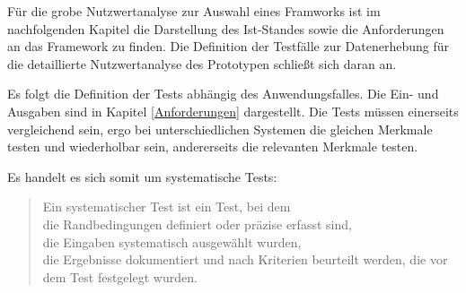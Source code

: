Für die grobe Nutzwertanalyse zur Auswahl eines Framworks ist im nachfolgenden Kapitel die Darstellung des Ist-Standes sowie die Anforderungen an das Framework zu finden.
Die Definition der Testfälle zur Datenerhebung für die detaillierte Nutzwertanalyse des Prototypen schließt sich daran an.

Es folgt die Definition der Tests abhängig des Anwendungsfalles.
Die Ein- und Ausgaben sind  in Kapitel \ref{Anforderungen} dargestellt.
Die Tests müssen einerseits vergleichend sein, ergo bei unterschiedlichen Systemen die gleichen Merkmale testen und wiederholbar sein, andererseits die relevanten Merkmale testen.

Es handelt es sich somit um systematische Tests:
\begin {quote}
Ein systematischer Test ist ein Test, bei dem\\
die Randbedingungen definiert oder präzise erfasst sind,\\
die Eingaben systematisch ausgewählt wurden,\\
die Ergebnisse dokumentiert und nach Kriterien beurteilt werden, die vor dem Test festgelegt wurden. \cite[S.446]{book:softwareengineering}
\end{quote}

